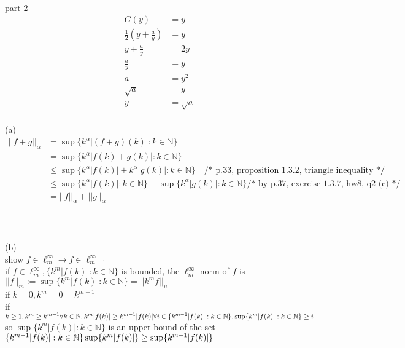 \documentclass[12pt, border = 4pt, multi]{article} %
\begin{document}
\\
\\
\\
part 2
\begin{align*}
G(y) &= y\\
\frac{1}{2}\left(y + \frac{a}{y}\right) &= y\\
y + \frac{a}{y} &= 2y\\
\frac{a}{y} &= y\\
a &= y ^ 2\\
\sqrt{a} &= y\\
y &= \sqrt{a}
\end{align*}
\newpage
{}\\
(a)
\begin{align*}
||f + g||_{\alpha} &= \sup\{k ^ {\alpha} |(f + g)(k)|: k \in \mathbb{N}\}\\
&= \sup\{k ^ {\alpha} |f(k) + g(k)|: k \in \mathbb{N}\}\\
&\leq \sup\{k ^ {\alpha} |f(k)| + k ^ {\alpha} |g(k)|: k \in \mathbb{N}\} \quad \text{/* p.33, proposition 1.3.2, triangle inequality */}\\
&\leq \sup\{k ^ {\alpha} |f(k)|: k \in \mathbb{N}\} + \sup\{k ^ {\alpha} |g(k)|: k \in \mathbb{N}\} \text{/* by p.37, exercise 1.3.7, hw8, q2 (c) */}\\
&= ||f||_{\alpha} + ||g||_{\alpha}
\end{align*}
\\
\\
\\
(b)\\
show $f \in \ell_m ^ {\infty} \rightarrow f \in \ell_{m - 1} ^ {\infty}$\\
if $f \in \ell_m ^ {\infty}, \{k ^ m |f(k)|: k \in \mathbb{N}\}$ is bounded, the $\ell_m ^ {\infty}$ norm of $f$ is\\
$||f||_m := \sup\{k ^ m|f(k)|: k \in \mathbb{N}\} = ||k ^ m f||_u$\\
if $k = 0, k ^ m = 0 = k ^ {m - 1}$\\
if $k \geq 1, k ^ m \geq k ^ {m - 1}\\
\forall k \in \mathbb{N}, k ^ m|f(k)| \geq k ^ {m - 1}|f(k)|\\
\forall i \in \{k ^ {m - 1}|f(k)|: k \in \mathbb{N}\}, \sup\{k ^ m|f(k)|: k \in \mathbb{N}\} \geq i$\\
so $\sup\{k ^ m|f(k)|: k \in \mathbb{N}\}$ is an upper bound of the set $\{k ^ {m - 1}|f(k)|: k \in \mathbb{N}\}\\
\sup\{k ^ m|f(k)|\} \geq \sup\{k ^ {m - 1}|f(k)|\}\\$
\end{document}
